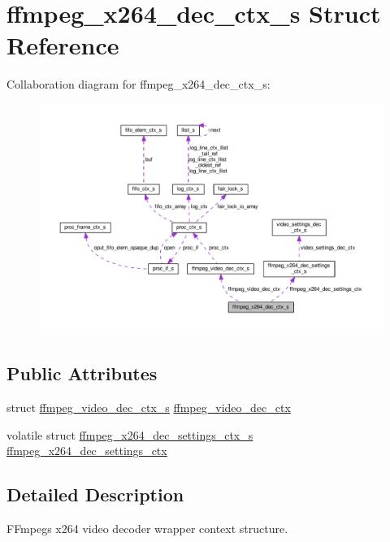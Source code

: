 \hypertarget{structffmpeg__x264__dec__ctx__s}{}\section{ffmpeg\+\_\+x264\+\_\+dec\+\_\+ctx\+\_\+s Struct Reference}
\label{structffmpeg__x264__dec__ctx__s}


Collaboration diagram for ffmpeg\+\_\+x264\+\_\+dec\+\_\+ctx\+\_\+s\+:\nopagebreak
\begin{figure}[H]
\begin{center}
\leavevmode
\includegraphics[width=350pt]{structffmpeg__x264__dec__ctx__s__coll__graph}
\end{center}
\end{figure}
\subsection*{Public Attributes}
\begin{DoxyCompactItemize}
\item 
struct \hyperlink{structffmpeg__video__dec__ctx__s}{ffmpeg\+\_\+video\+\_\+dec\+\_\+ctx\+\_\+s} \hyperlink{structffmpeg__x264__dec__ctx__s_a25ec0cfebb46f74b12f5229e3908d7b7}{ffmpeg\+\_\+video\+\_\+dec\+\_\+ctx}
\item 
volatile struct \hyperlink{structffmpeg__x264__dec__settings__ctx__s}{ffmpeg\+\_\+x264\+\_\+dec\+\_\+settings\+\_\+ctx\+\_\+s} \hyperlink{structffmpeg__x264__dec__ctx__s_a4b7eeb30edd5fc36212f33c1becf9fdf}{ffmpeg\+\_\+x264\+\_\+dec\+\_\+settings\+\_\+ctx}
\end{DoxyCompactItemize}


\subsection{Detailed Description}
F\+Fmpeg\textquotesingle{}s x264 video decoder wrapper context structure. 

